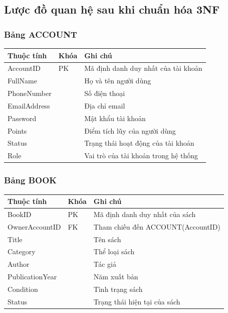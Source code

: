 \documentclass{article}
\begin{document}
\subsection*{Lược đồ quan hệ sau khi chuẩn hóa 3NF}

\subsubsection*{Bảng ACCOUNT}
{\small
\begin{longtable}{L{0.28\textwidth}L{0.12\textwidth}L{0.52\textwidth}}
\toprule
\textbf{Thuộc tính} & \textbf{Khóa} & \textbf{Ghi chú} \\
\midrule
AccountID & PK & Mã định danh duy nhất của tài khoản \\
FullName & & Họ và tên người dùng \\
PhoneNumber & & Số điện thoại \\
EmailAddress & & Địa chỉ email \\
Password & & Mật khẩu tài khoản \\
Points & & Điểm tích lũy của người dùng \\
Status & & Trạng thái hoạt động của tài khoản \\
Role & & Vai trò của tài khoản trong hệ thống \\
\bottomrule
\end{longtable}
}

\subsubsection*{Bảng BOOK}
{\small
\begin{longtable}{L{0.28\textwidth}L{0.12\textwidth}L{0.52\textwidth}}
\toprule
\textbf{Thuộc tính} & \textbf{Khóa} & \textbf{Ghi chú} \\
\midrule
BookID & PK & Mã định danh duy nhất của sách \\
OwnerAccountID & FK & Tham chiếu đến ACCOUNT(AccountID) \\
Title & & Tên sách \\
Category & & Thể loại sách \\
Author & & Tác giả \\
PublicationYear & & Năm xuất bản \\
Condition & & Tình trạng sách \\
Status & & Trạng thái hiện tại của sách \\
\bottomrule
\end{longtable}
}
\end{document}

